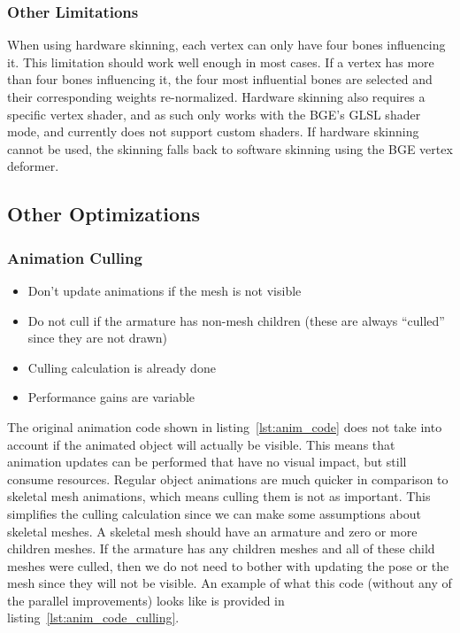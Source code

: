 \subsubsection{Other Limitations}

When using hardware skinning, each vertex can only have four bones influencing it. This limitation should work well enough in most cases. If a vertex has more than four bones influencing it, the four most influential bones are selected and their corresponding weights re-normalized. Hardware skinning also requires a specific vertex shader, and as such only works with the BGE's GLSL shader mode, and currently does not support custom shaders. If hardware skinning cannot be used, the skinning falls back to software skinning using the BGE vertex deformer.


\subsection{Other Optimizations}
\subsubsection{Animation Culling}
\ifsummaries
\begin{itemize}
 \item Don't update animations if the mesh is not visible
 \item Do not cull if the armature has non-mesh children (these are always ``culled'' since they are not drawn)
 \item Culling calculation is already done
 \item Performance gains are variable
\end{itemize}
\fi

The original animation code shown in listing~\ref{lst:anim_code} does not take into account if the animated object will actually be visible. This means that animation updates can be performed that have no visual impact, but still consume resources. Regular object animations are much quicker in comparison to skeletal mesh animations, which means culling them is not as important. This simplifies the culling calculation since we can make some assumptions about skeletal meshes. A skeletal mesh should have an armature and zero or more children meshes. If the armature has any children meshes and all of these child meshes were culled, then we do not need to bother with updating the pose or the mesh since they will not be visible. An example of what this code (without any of the parallel improvements) looks like is provided in listing~\ref{lst:anim_code_culling}.


